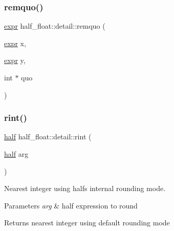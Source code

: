 \subsubsection{\texorpdfstring{remquo()}{remquo()}\hspace{0.1cm}{\footnotesize\ttfamily [4/4]}}
{\footnotesize\ttfamily \hyperlink{structhalf__float_1_1detail_1_1expr}{expr} half\+\_\+float\+::detail\+::remquo (\begin{DoxyParamCaption}\item[{\hyperlink{structhalf__float_1_1detail_1_1expr}{expr}}]{x,  }\item[{\hyperlink{structhalf__float_1_1detail_1_1expr}{expr}}]{y,  }\item[{int $\ast$}]{quo }\end{DoxyParamCaption})\hspace{0.3cm}{\ttfamily [inline]}}

\mbox{\label{namespacehalf__float_1_1detail_a25d6e6a301530bc1b48159f74cb5a0b4}} 
\subsubsection{\texorpdfstring{rint()}{rint()}\hspace{0.1cm}{\footnotesize\ttfamily [1/2]}}
{\footnotesize\ttfamily \hyperlink{classhalf__float_1_1half}{half} half\+\_\+float\+::detail\+::rint (\begin{DoxyParamCaption}\item[{\hyperlink{classhalf__float_1_1half}{half}}]{arg }\end{DoxyParamCaption})\hspace{0.3cm}{\ttfamily [inline]}}

Nearest integer using half\textquotesingle{}s internal rounding mode. 
\begin{DoxyParams}{Parameters}
{\em arg} & half expression to round \\
\hline
\end{DoxyParams}
\begin{DoxyReturn}{Returns}
nearest integer using default rounding mode 
\end{DoxyReturn}
\mbox{\label{namespacehalf__float_1_1detail_aea0610c62a916840b0d0409b239965d4}} 
